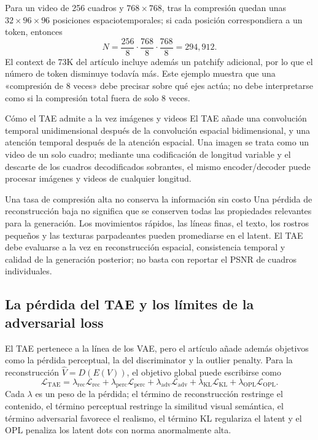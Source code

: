 
Para un video de 256 cuadros y $768\times768$, tras la compresión quedan unas $32\times96\times96$ posiciones espaciotemporales; si cada posición correspondiera a un token, entonces
\[
N=\frac{256}{8}\cdot\frac{768}{8}\cdot\frac{768}{8}
=294{,}912.
\]
El context de 73K del artículo incluye además un patchify adicional, por lo que el número de token disminuye todavía más. Este ejemplo muestra que una «compresión de 8 veces» debe precisar sobre qué ejes actúa; no debe interpretarse como si la compresión total fuera de solo 8 veces.

\begin{knowledgebox}{Cómo el TAE admite a la vez imágenes y videos}
El TAE añade una convolución temporal unidimensional después de la convolución espacial bidimensional, y una atención temporal después de la atención espacial. Una imagen se trata como un video de un solo cuadro; mediante una codificación de longitud variable y el descarte de los cuadros decodificados sobrantes, el mismo encoder/decoder puede procesar imágenes y videos de cualquier longitud.
\end{knowledgebox}

\begin{warningbox}{Una tasa de compresión alta no conserva la información sin costo}
Una pérdida de reconstrucción baja no significa que se conserven todas las propiedades relevantes para la generación. Los movimientos rápidos, las líneas finas, el texto, los rostros pequeños y las texturas parpadeantes pueden promediarse en el latent. El TAE debe evaluarse a la vez en reconstrucción espacial, consistencia temporal y calidad de la generación posterior; no basta con reportar el PSNR de cuadros individuales.
\end{warningbox}

\subsection{La pérdida del TAE y los límites de la adversarial loss}

El TAE pertenece a la línea de los VAE, pero el artículo añade además objetivos como la pérdida perceptual, la del discriminator y la outlier penalty. Para la reconstrucción $\hat V=D(E(V))$, el objetivo global puede escribirse como
\[
\mathcal L_{\mathrm{TAE}}
=\lambda_{\mathrm{rec}}\mathcal L_{\mathrm{rec}}
+\lambda_{\mathrm{perc}}\mathcal L_{\mathrm{perc}}
+\lambda_{\mathrm{adv}}\mathcal L_{\mathrm{adv}}
+\lambda_{\mathrm{KL}}\mathcal L_{\mathrm{KL}}
+\lambda_{\mathrm{OPL}}\mathcal L_{\mathrm{OPL}}.
\]
Cada $\lambda$ es un peso de la pérdida; el término de reconstrucción restringe el contenido, el término perceptual restringe la similitud visual semántica, el término adversarial favorece el realismo, el término KL regulariza el latent y el OPL penaliza los latent dots con norma anormalmente alta.

